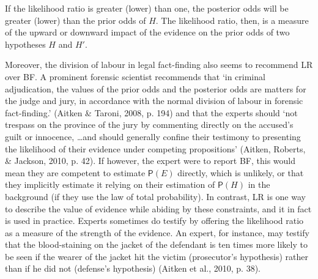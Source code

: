 \documentclass[10pt,dvipsnames,enabledeprecatedfontcommands]{scrartcl}
\newcommand{\pr}[1]{\mathsf{P}(#1)}
\begin{document}
\noindent If the likelihood ratio is greater (lower) than one, the
posterior odds will be greater (lower) than the prior odds of \(H\). The
likelihood ratio, then, is a measure of the upward or downward impact of
the evidence on the prior odds of two hypotheses \(H\) and \(H'\).

Moreover, the division of labour in legal fact-finding also seems to
recommend \textsf{LR} over \textsf{BF}. A prominent forensic scientist
recommends that `in criminal adjudication, the values of the prior odds
and the posterior odds are matters for the judge and jury, in accordance
with the normal division of labour in forensic fact-finding.' (Aitken \&
Taroni, 2008, p. 194) and that the experts should `not trespass on the
province of the jury by commenting directly on the accused's guilt or
innocence, \dots and should generally confine their testimony to
presenting the likelihood of their evidence under competing
propositions' (Aitken, Roberts, \& Jackson, 2010, p. 42). If however,
the expert were to report \textsf{BF}, this would mean they are
competent to estimate \(\pr{E}\) directly, which is unlikely, or that
they implicitly estimate it relying on their estimation of \(\pr{H}\) in
the background (if they use the law of total probability). In contrast,
\textsf{LR} is one way to describe the value of evidence while abiding
by these constraints, and it in fact is used in practice. Experts
sometimes do testify by offering the likelihood ratio as a measure of
the strength of the evidence. An expert, for instance, may testify that
the blood-staining on the jacket of the defendant is ten times more
likely to be seen if the wearer of the jacket hit the victim
(prosecutor's hypothesis) rather than if he did not (defense's
hypothesis) (Aitken et al., 2010, p. 38).
\end{document}
